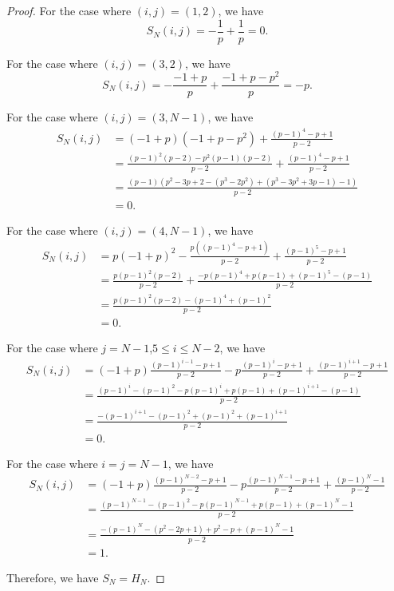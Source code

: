 \documentclass[12pt, leqno]{amsart}
\numberwithin{equation}{section}
\theoremstyle{plain}
\theoremstyle{definition}
\newcommand{\0}{\mathbf{0}}
\begin{document}
\begin{proof}
For the case where $(i,j)=(1,2)$, we have
\[
S_N(i,j)=-\frac{1}{p}+\frac{1}{p}=0.
\]

For the case where $(i,j)=(3,2)$, we have
\[
S_N(i,j)=-\frac{-1+p}{p}+\frac{-1+p-p^2}{p}=-p.
\]

For the case where $(i,j)=(3,N-1)$, we have
\begin{align*}
S_N(i,j)&=(-1+p)(-1+p-p^2)+\frac{(p-1)^4-p+1}{p-2}\\
&=\frac{(p-1)^2(p-2)-p^2(p-1)(p-2)}{p-2}+\frac{(p-1)^4-p+1}{p-2}\\
&=\frac{(p-1)(p^2-3p+2-(p^3-2p^2)+(p^3-3p^2+3p-1)-1)}{p-2}\\
&=0.
\end{align*}

For the case where $(i,j)=(4,N-1)$, we have
\begin{align*}
S_N(i,j)&=p(-1+p)^2-\frac{p((p-1)^4-p+1)}{p-2}+\frac{(p-1)^5-p+1}{p-2}\\
&=\frac{p(p-1)^2(p-2)}{p-2}+\frac{-p(p-1)^4+p(p-1)+(p-1)^5-(p-1)}{p-2}\\
&=\frac{p(p-1)^2(p-2)-(p-1)^4+(p-1)^2}{p-2}\\
&=0.
\end{align*}

For the case where $j=N-1$,\;$5\leq i\leq N-2$, we have
\begin{align*}
S_N(i,j)&=(-1+p)\frac{(p-1)^{i-1}-p+1}{p-2}-p\frac{(p-1)^i-p+1}{p-2}+\frac{(p-1)^{i+1}-p+1}{p-2}\\
&=\frac{(p-1)^i-(p-1)^2-p(p-1)^i+p(p-1)+(p-1)^{i+1}-(p-1)}{p-2}\\
&=\frac{-(p-1)^{i+1}-(p-1)^2+(p-1)^2+(p-1)^{i+1}}{p-2}\\
&=0.
\end{align*}

For the case where $i=j=N-1$, we have
\begin{align*}
S_N(i,j)&=(-1+p)\frac{(p-1)^{N-2}-p+1}{p-2}-p\frac{(p-1)^{N-1}-p+1}{p-2}+\frac{(p-1)^N-1}{p-2}\\
&=\frac{(p-1)^{N-1}-(p-1)^2-p(p-1)^{N-1}+p(p-1)+(p-1)^N-1}{p-2}\\
&=\frac{-(p-1)^N-(p^2-2p+1)+p^2-p+(p-1)^N-1}{p-2}\\
&=1.
\end{align*}

Therefore, we have $S_N=H_N$.
\end{proof}
\end{document}
